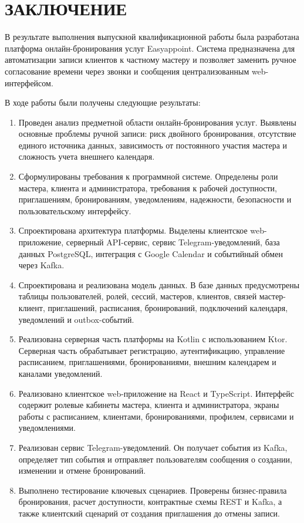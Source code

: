 \section*{ЗАКЛЮЧЕНИЕ}

В результате выполнения выпускной квалификационной работы была разработана платформа онлайн-бронирования услуг Easyappoint. Система предназначена для автоматизации записи клиентов к частному мастеру и позволяет заменить ручное согласование времени через звонки и сообщения централизованным web-интерфейсом.

В ходе работы были получены следующие результаты:
\begin{enumerate}
\item Проведен анализ предметной области онлайн-бронирования услуг. Выявлены основные проблемы ручной записи: риск двойного бронирования, отсутствие единого источника данных, зависимость от постоянного участия мастера и сложность учета внешнего календаря.
\item Сформулированы требования к программной системе. Определены роли мастера, клиента и администратора, требования к рабочей доступности, приглашениям, бронированиям, уведомлениям, надежности, безопасности и пользовательскому интерфейсу.
\item Спроектирована архитектура платформы. Выделены клиентское web-приложение, серверный API-сервис, сервис Telegram-уведомлений, база данных PostgreSQL, интеграция с Google Calendar и событийный обмен через Kafka.
\item Спроектирована и реализована модель данных. В базе данных предусмотрены таблицы пользователей, ролей, сессий, мастеров, клиентов, связей мастер-клиент, приглашений, расписания, бронирований, подключений календаря, уведомлений и outbox-событий.
\item Реализована серверная часть платформы на Kotlin с использованием Ktor. Серверная часть обрабатывает регистрацию, аутентификацию, управление расписанием, приглашениями, бронированиями, внешним календарем и каналами уведомлений.
\item Реализовано клиентское web-приложение на React и TypeScript. Интерфейс содержит ролевые кабинеты мастера, клиента и администратора, экраны работы с расписанием, клиентами, бронированиями, профилем, сервисами и уведомлениями.
\item Реализован сервис Telegram-уведомлений. Он получает события из Kafka, определяет тип события и отправляет пользователям сообщения о создании, изменении и отмене бронирований.
\item Выполнено тестирование ключевых сценариев. Проверены бизнес-правила бронирования, расчет доступности, контрактные схемы REST и Kafka, а также клиентский сценарий от создания приглашения до отмены записи.
\end{enumerate}

